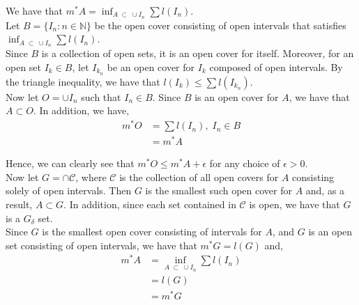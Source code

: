 \documentclass[12pt]{article}
\newenvironment{problem}[2][Problem]{\begin{trivlist}
\item[\hskip \labelsep {\bfseries #1}\hskip \labelsep {\bfseries #2.}]}{\end{trivlist}}
\begin{document}
\begin{problem}{2}
\end{problem}

We have that $m^*A = \inf_{A \; \subset \; \cup I_n} \sum l(I_n)$.\\

Let $B = \{I_n: n \in \mathbb{N}\}$ be the open cover consisting of open intervals that satisfies $\inf_{A \; \subset \; \cup I_n} \sum l(I_n)$.\\

Since $B$ is a collection of open sets, it is an open cover for itself. Moreover, for an open set $I_k \in B$, let $I_{k_n}$ be an open cover for $I_k$ composed of open intervals. By the triangle inequality, we have that $l(I_k) \leq \sum l(I_{k_n})$.\\

Now let $O = \cup I_n$ such that $I_n \in B$. Since $B$ is an open cover for $A$, we have that $A \subset O$. In addition, we have, 
\begin{align*}
m^*O &= \sum l(I_n), \; I_n \in B\\
&= m^*A
\end{align*}

Hence, we can clearly see that $m^*O \leq m^*A + \epsilon$ for any choice of $\epsilon > 0$.\\

Now let $G = \cap \mathscr{C}$, where $\mathscr{C}$ is the collection of all open covers for $A$ consisting solely of open intervals. Then $G$ is the smallest such open cover for $A$ and, as a result, $A \subset G$. In addition, since each set contained in $\mathscr{C}$ is open, we have that $G$ is a $G_{\delta}$ set.\\

Since $G$ is the smallest open cover consisting of intervals for $A$, and $G$ is an open set consisting of open intervals, we have that $m^*G = l(G)$ and,
\begin{align*}
m^*A &= \inf_{A \; \subset \; \cup I_n} \sum l(I_n)\\
&= l(G)\\
&= m^*G
\end{align*}

\begin{problem}{3}
\end{problem}
\end{document}
